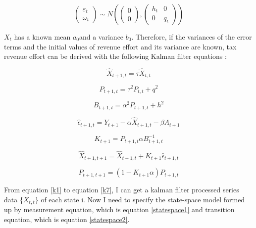 \begin{equation}
    (\begin{array}{l}\varepsilon_t \\ \omega_t\end{array}) \sim N\left(\left(\begin{array}{l}0 \\ 0\end{array}\right) ,\left(\begin{array}{ll}h_t & 0 \\ 0 & q_t\end{array}\right)\right) \label{ssvar}
\end{equation}

$X_t$ has a known mean $a_0 $and a variance $b_0$. Therefore, if the variances of the error terms and the initial values of revenue effort and its variance are known, tax revenue effort can be derived with the following Kalman filter equations \parencite{doi:10.1080/13504850500425345}:

\begin{equation}
    \hat{X}_{t+1,t}=\tau \hat{X}_{t,t}\label{k1}
\end{equation}

\begin{equation}
    P_{t+1,t}=\tau^2 P_{t,t}+q^2
\end{equation}

\begin{equation}
    B_{t+1,t}=\alpha^2 P_{t+1,t}+h^2
\end{equation}

\begin{equation}
    \hat{\epsilon}_{t+1,t}=Y_{t+1}-\alpha \hat{X}_{t+1,t}-\beta A_{t+1}
\end{equation}

\begin{equation}
    K_{t+1}=P_{t+1,t}\alpha B^{-1}_{t+1,t}
\end{equation}

\begin{equation}
    \hat{X}_{t+1,t+1}=\hat{X}_{t+1,t}+K_{t+1}\hat{\epsilon}_{t+1,t}
\end{equation}

\begin{equation}
    P_{t+1,t+1}=(1-K_{t+1}\alpha)P_{t+1,t}\label{k7}
\end{equation}

From equation \ref{k1} to equation \ref{k7}, I can get a kalman filter processed series data \{$X_{t,t}$\} of each state i. Now I need to specify the state-space model formed up by measurement equation, which is equation \ref{statespace1} and transition equation, which is equation \ref{statespace2}.

